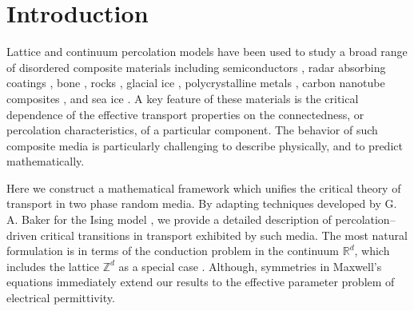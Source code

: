 \documentclass[english,12pt,jmp,graphicx]{revtex4-1}
\begin{document}

\maketitle %

%
\section{Introduction}\label{sec:Introduction}
%
Lattice and continuum percolation models have been used to study a
broad range of disordered composite materials including semiconductors 
\cite{Efros-84}, radar absorbing coatings \cite{Kusy:N-58},
bone \cite{Sasaki:JTB:25,Golden:JoB:337}, rocks
\cite{Bourbie:JGR-11524,Broadbent:PCPS-629}, 
glacial ice \cite{Enting:1985:LSM}, polycrystalline metals
\cite{Chen:PRL:2007}, carbon nanotube composites
\cite{Kyrylyuk:PNAS:2008}, and sea ice
\cite{Golden:2007:GRL,Golden:S-2238}. A key 
feature of these materials is the critical dependence of the effective
transport properties on the connectedness, or percolation
characteristics, of a particular component. The behavior of such
composite media is particularly challenging to describe physically,
and to predict mathematically.  

Here we construct a mathematical framework which unifies the critical
theory of transport in two phase random media. By adapting techniques
developed by G. A. Baker for the Ising model \cite{Baker-1990}, we
provide a detailed description of percolation--driven critical
transitions in transport exhibited by such media. The most natural
formulation is in terms of the conduction problem in the continuum
$\mathbb{R}^d$, which includes the lattice $\mathbb{Z}^d$ as a special
case \cite{Golden:JMP-5627,Golden:CMP-473}. Although, symmetries
in Maxwell's equations \cite{MILTON:2002:TC} immediately extend our
results to the effective parameter problem of electrical
permittivity.
\end{document}
